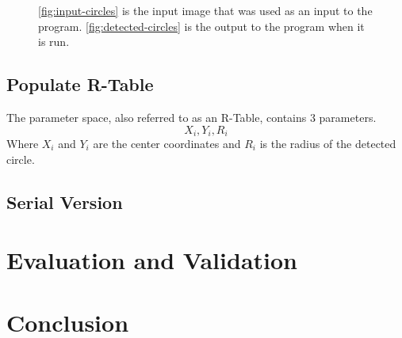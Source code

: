 \documentclass[conference]{IEEEtran}
\begin{document}
\begin{figure}[t]
  \centering
  \hfil
  \caption{\autoref{fig:input-circles} is the input image that was used as an input to the program. \autoref{fig:detected-circles} is the output to the program when it is run.}
\end{figure}







\subsection{Populate R-Table}
The parameter space, also referred to as an R-Table, contains 3 parameters.
\begin{equation}X_{i}, Y_{i}, R_{i}\label{circle-parameters}\end{equation}
Where $X_i$ and $Y_i$ are the center coordinates and $R_i$ is the radius of the detected circle.


\subsection{Serial Version}



\section{Evaluation and Validation}



\section{Conclusion}




% 

\end{document}
